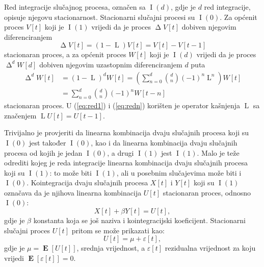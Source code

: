 \documentclass[lmodern, utf8, diplomski, numeric]{fer}
\newcommand{\E}[1]{\operatorname{\mathbf{E}}\left[#1\right]}
\newcommand{\I}[1]{\operatorname{\mathrm{I}}\left(#1\right)}
\newcommand{\diff}{\operatorname{\mathrm{\Delta}}}
\newcommand{\diffn}[1]{\operatorname{\mathrm{\Delta}}^d}
\newcommand{\lag}{\operatorname{\mathrm{L}}}
\begin{document}
  Red integracije slučajnog procesa, označen sa $\I{d}$, gdje je $d$ red integracije, opisuje njegovu stacionarnost.
  Stacionarni slučajni procesi su $\I{0}$.
  Za općenit proces $V\left[t\right]$ koji je $\I{1}$ vrijedi da je proces $\diff V\left[t\right]$ dobiven njegovim diferenciranjem
  \begin{equation}
  \label{eq:red1}
  \diff V\left[t\right] = \left(1 - \lag\right) V\left[t\right] = V\left[t\right] - V\left[t - 1\right]
  \end{equation}
  stacionaran proces, a za općenit proces $W\left[t\right]$ koji je $\I{d}$ vrijedi da je proces $\diffn{d} W\left[d\right]$ dobiven njegovim uzastopnim diferenciranjem $d$ puta
  \begin{align}
  \diffn{d} W\left[t\right] &= \left(1 - \lag\right)^d W\left[t\right] = \left( \sum_{n = 0}^{d} \binom{d}{n} \left(-1\right)^n\lag^n \right) W\left[t\right] \nonumber \\
  \label{eq:redn}
  &= \sum_{n = 0}^{d} \binom{d}{n} \left(-1\right)^n W\left[t - n\right]
  \end{align}
  stacionaran proces.
  U (\ref{eq:red1}) i (\ref{eq:redn}) korišten je operator kašnjenja $\lag$ sa značenjem $\lag U\left[t\right] = U\left[t - 1\right]$.
  
  Trivijalno je provjeriti da linearna kombinacija dvaju slučajnih procesa koji su $\I{0}$ jest također $\I{0}$, kao i da linearna kombinacija dvaju slučajnih procesa od kojih je jedan $\I{0}$, a drugi $\I{1}$ jest $\I{1}$.
  Malo je teže odrediti kojeg je reda integracije linearna kombinacija dvaju slučajnih procesa koji su $\I{1}$: to može biti $\I{1}$, ali u posebnim slučajevima može biti i $\I{0}$.
  Kointegracija dvaju slučajnih procesa $X\left[t\right]$ i $Y\left[t\right]$ koji su $\I{1}$ označava da je njihova linearna kombinacija $U\left[t\right]$ stacionaran proces, odnosno $\I{0}$:
  \begin{equation}
  X\left[t\right] + \beta Y\left[t\right] = U\left[t\right],
  \end{equation}
  gdje je $\beta$ konstanta koja se još naziva i kointegracijski koeficijent.
  Stacionarni slučajni proces $U\left[t\right]$ pritom se može prikazati kao:
  \begin{equation}
  U\left[t\right] = \mu + \varepsilon\left[t\right],
  \end{equation}
  gdje je $\mu = \E{U\left[t\right]}$, srednja vrijednost, a $\varepsilon\left[t\right]$ rezidualna vrijednost za koju vrijedi $\E{\varepsilon\left[t\right]} = 0$.
  
\end{document}
